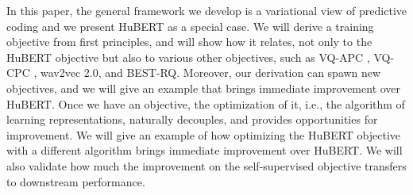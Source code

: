 In this paper, the general framework we develop is a variational view of predictive coding and we present HuBERT as a special case.
We will derive a training objective from first principles, and will show how it relates, not only to the HuBERT objective but also to various other objectives, such as VQ-APC \citep{chung2020vector}, VQ-CPC \citep{niekerk2020vector}, wav2vec 2.0, and BEST-RQ.
Moreover, our derivation can spawn new objectives, and we will give an example that brings immediate improvement over HuBERT.
Once we have an objective, the optimization of it, i.e., the algorithm of learning representations, naturally decouples, and provides opportunities for improvement.
We will give an example of how optimizing the HuBERT objective with a different algorithm brings immediate improvement over HuBERT.
We will also validate how much the improvement on the self-supervised objective transfers to downstream performance.

%
%
%
%
%
%
%
%
%
%
%
%
%

%
%
%
